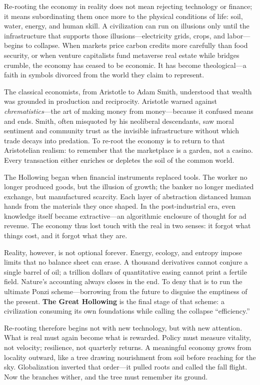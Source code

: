 \documentclass[11pt,twoside]{book}
\begin{document}
Re-rooting the economy in reality does not mean rejecting technology or finance; it means subordinating them once more to the physical conditions of life: soil, water, energy, and human skill.  
A civilization can run on illusions only until the infrastructure that supports those illusions—electricity grids, crops, and labor—begins to collapse.  
When markets price carbon credits more carefully than food security, or when venture capitalists fund metaverse real estate while bridges crumble, the economy has ceased to be economic.  
It has become theological—a faith in symbols divorced from the world they claim to represent.

The classical economists, from Aristotle to Adam Smith, understood that wealth was grounded in production and reciprocity.  
Aristotle warned against \textit{chrematistics}—the art of making money from money—because it confused means and ends.  
Smith, often misquoted by his neoliberal descendants, saw moral sentiment and community trust as the invisible infrastructure without which trade decays into predation.  
To re-root the economy is to return to that Aristotelian realism: to remember that the marketplace is a garden, not a casino.  
Every transaction either enriches or depletes the soil of the common world.

The Hollowing began when financial instruments replaced tools.  
The worker no longer produced goods, but the illusion of growth; the banker no longer mediated exchange, but manufactured scarcity.  
Each layer of abstraction distanced human hands from the materials they once shaped.  
In the post-industrial era, even knowledge itself became extractive—an algorithmic enclosure of thought for ad revenue.  
The economy thus lost touch with the real in two senses: it forgot what things cost, and it forgot what they are.

Reality, however, is not optional forever.  
Energy, ecology, and entropy impose limits that no balance sheet can erase.  
A thousand derivatives cannot conjure a single barrel of oil; a trillion dollars of quantitative easing cannot print a fertile field.  
Nature’s accounting always closes in the end.  
To deny that is to run the ultimate Ponzi scheme—borrowing from the future to disguise the emptiness of the present.  
\textbf{The Great Hollowing} is the final stage of that scheme: a civilization consuming its own foundations while calling the collapse “efficiency.”

Re-rooting therefore begins not with new technology, but with new attention.  
What is real must again become what is rewarded.  
Policy must measure vitality, not velocity; resilience, not quarterly returns.  
A meaningful economy grows from locality outward, like a tree drawing nourishment from soil before reaching for the sky.  
Globalization inverted that order—it pulled roots and called the fall flight.  
Now the branches wither, and the tree must remember its ground.
\end{document}
